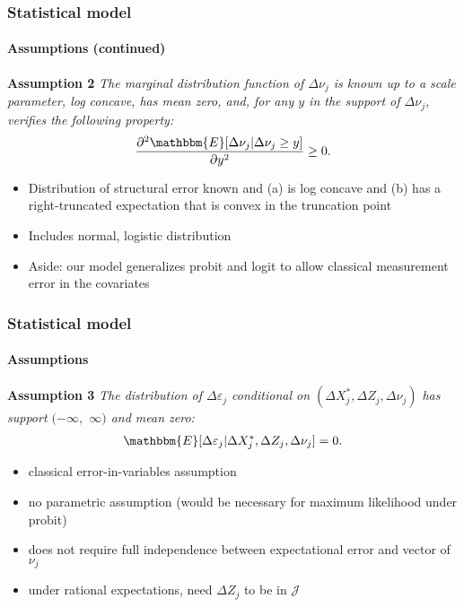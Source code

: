 
\begin{frame}
\frametitle{Statistical model} \framesubtitle{Assumptions (continued)}

\textbf{Assumption 2} \textit{The marginal distribution function of $%
\Delta\nu_{j}$ is known up to a scale parameter, log concave, has mean zero,
and, for any $y$ in the support of $\Delta\nu_{j}$, verifies the following
property: 
\begin{align*}
\frac{\partial^{2}\mathbbm{E}[\Delta\nu_{j}|\Delta\nu_{j}\geq y]}{\partial
y^{2}}\geq 0.
\end{align*}%
} \pause

\begin{itemize}
\item Distribution of structural error known and (a) is log concave and (b)
has a right-truncated expectation that is convex in the truncation point

\item Includes normal, logistic distribution

\item Aside: our model generalizes probit and logit to allow classical
measurement error in the covariates
\end{itemize}
\end{frame}


\begin{frame}
\frametitle{Statistical model} \framesubtitle{Assumptions}

\textbf{Assumption 3} \textit{The distribution of $\Delta\varepsilon_{j}$
conditional on $(\Delta X^{*}_{j},\Delta Z_{j},\Delta \nu_{j})$ has support $%
(-\infty,$ $\infty)$ and mean zero: 
\begin{align*}
\mathbbm{E}[\Delta\varepsilon_{j}|\Delta X^{*}_{j},\Delta
Z_{j},\Delta\nu_{j}]=0.
\end{align*}%
} \pause

\begin{itemize}
\item classical error-in-variables assumption

\item no parametric assumption (would be necessary for maximum likelihood
under probit)

\item does not require full independence between expectational error and
vector of $\nu_{j}$

\item under rational expectations, need $\Delta Z_{j}$ to be in $\mathcal{J}$
\end{itemize}
\end{frame}

